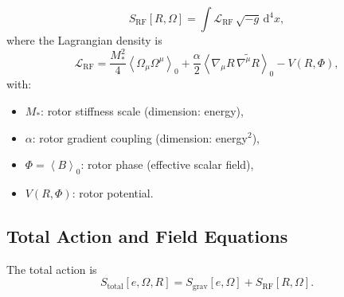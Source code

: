\documentclass[11pt,a4paper]{article}
\numberwithin{equation}{section}
\theoremstyle{plain}
\theoremstyle{definition}
\theoremstyle{remark}
\newcommand{\grade}[2]{\left\langle #1 \right\rangle_{#2}}
\newcommand{\scal}[1]{\grade{#1}{0}}       %
\newcommand{\rev}[1]{\widetilde{#1}}       %
\newcommand{\dd}{\mathrm{d}}
\begin{document}
\begin{equation}
S_{\mathrm{RF}}[R,\Omega] = \int \mathcal{L}_{\mathrm{RF}}\, \sqrt{-g}\, \dd^4x,
\label{eq:rotor-action}
\end{equation}
where the Lagrangian density is
\begin{equation}
\mathcal{L}_{\mathrm{RF}} = \frac{M_*^2}{4}\scal{\Omega_\mu \Omega^\mu} + \frac{\alpha}{2}\scal{\nabla_\mu R \, \rev{\nabla^\mu R}} - V(R,\Phi),
\label{eq:rotor-lagrangian}
\end{equation}
with:
\begin{itemize}
\item $M_*$: rotor stiffness scale (dimension: energy),
\item $\alpha$: rotor gradient coupling (dimension: energy$^2$),
\item $\Phi = \scal{B}$: rotor phase (effective scalar field),
\item $V(R,\Phi)$: rotor potential.
\end{itemize}

\subsection{Total Action and Field Equations}

The total action is
\begin{equation}
S_{\mathrm{total}}[e,\Omega,R] = S_{\mathrm{grav}}[e,\Omega] + S_{\mathrm{RF}}[R,\Omega].
\label{eq:total-action}
\end{equation}
\end{document}
